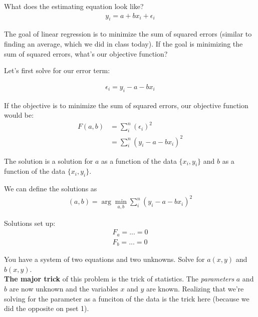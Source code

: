 \documentclass{article}
\begin{document}
What does the estimating equation look like? 
\begin{align}
    y_i = a + b x_i + \epsilon_i
\end{align}

The goal of linear regression is to minimize the sum of squared errors (similar to finding an average, which we did in class today). If the goal is minimizing the sum of squared errors, what's our objective function? 

Let's first solve for our error term:

\begin{align}
    \epsilon_i = y_i - a - bx_i
\end{align}

If the objective is to minimize the sum of squared errors, our objective function would be: 
\begin{align}
    F(a,b) &= \sum_i^n (\epsilon_i)^2\\
    &= \sum_i^n (y_i - a - bx_i)^2
\end{align}

The solution is a solution for $a$ as a function of the data $\{x_i, y_i\}$ and $b$ as a function of the data $\{x_i, y_i\}$. 

We can define the solutions as 
\begin{align}
    (a,b) = \arg \min_{a,b} \sum_i^n (y_i - a - bx_i)^2
\end{align}

Solutions set up:
\begin{align}
    F_a = ... = 0\\
    F_b = ... = 0
\end{align}

You have a system of two equations and two unknowns. Solve for $a(x,y)$ and $b(x,y)$. \\

\textbf{The major trick} of this problem is the trick of statistics. The \textit{parameters} $a$ and $b$ are now unknown and the variables $x$ and $y$ are known. Realizing that we're solving for the parameter as a funciton of the data is the trick here (because we did the opposite on pset 1). 
\end{document}

